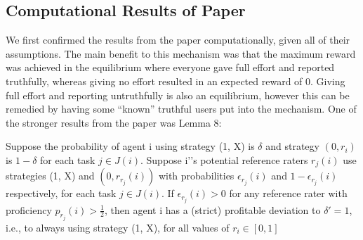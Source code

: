 \documentclass{scrartcl}
\begin{document}
\subsection{Computational Results of Paper}

We first confirmed the results from the paper computationally, given all of their assumptions. The main benefit to this mechanism was that the maximum reward was achieved in the equilibrium where everyone gave full effort and reported truthfully, whereas giving no effort resulted in an expected reward of 0. Giving full effort and reporting untruthfully is also an equilibrium, however this can be remedied by having some ``known'' truthful users put into the mechanism. One of the stronger results from the paper was Lemma 8:
 
\begin{displayquote}
Suppose the probability of agent i using strategy (1, X) is $\delta$ and strategy $(0, r_i)$ is $1-\delta$ for each task $j \in J(i)$. Suppose i'’s potential reference raters $r_j (i)$ use strategies (1, X) and $(0, r_{r_j} (i))$ with probabilities $\epsilon_{r_j}(i)$ and $1-\epsilon_{r_j}(i)$ respectively, for each task $j \in J(i)$. If $\epsilon_{r_j}(i) > 0$ for any reference rater with proficiency $p_{r_j} (i) > \frac{1}{2}$, then agent i has a (strict) profitable deviation to $\delta'=1$, i.e., to always using strategy (1, X), for all values of $r_i \in [0,1]$
\end{displayquote}
\end{document}
